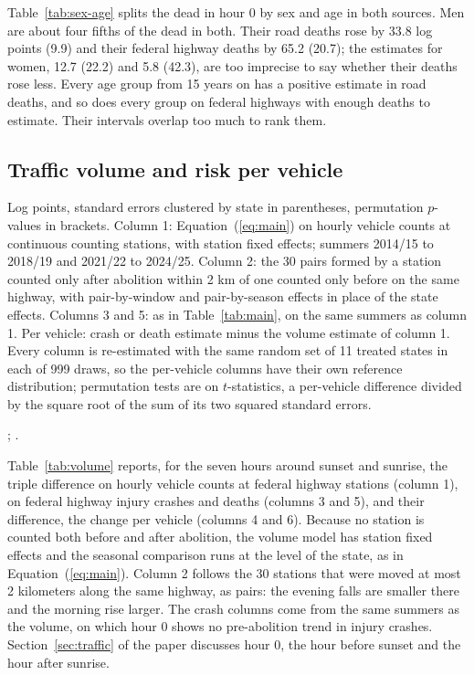 Table~\ref{tab:sex-age} splits the dead in hour 0 by sex and age in both sources. Men are about four fifths of the dead in both. Their road deaths rose by 33.8 log points (9.9) and their federal highway deaths by 65.2 (20.7); the estimates for women, 12.7 (22.2) and 5.8 (42.3), are too imprecise to say whether their deaths rose less. Every age group from 15 years on has a positive estimate in road deaths, and so does every group on federal highways with enough deaths to estimate. Their intervals overlap too much to rank them.

\subsection{Traffic volume and risk per vehicle}

\begin{table}[tbp]
  \caption{Traffic Volume and Risk per Vehicle on Federal Highways}
  \label{tab:volume}
  \centering\footnotesize
  
  \begin{tablenotes}[Notes]
  Log points, standard errors clustered by state in parentheses, permutation $p$-values in brackets. Column 1: Equation~(\ref{eq:main}) on hourly vehicle counts at continuous counting stations, with station fixed effects; summers 2014/15 to 2018/19 and 2021/22 to 2024/25. Column 2: the 30 pairs formed by a station counted only after abolition within 2 km of one counted only before on the same highway, with pair-by-window and pair-by-season effects in place of the state effects. Columns 3 and 5: as in Table~\ref{tab:main}, on the same summers as column 1. Per vehicle: crash or death estimate minus the volume estimate of column 1. Every column is re-estimated with the same random set of 11 treated states in each of 999 draws, so the per-vehicle columns have their own reference distribution; permutation tests are on $t$-statistics, a per-vehicle difference divided by the square root of the sum of its two squared standard errors.
  \end{tablenotes}
  \begin{tablenotes}[Sources]
  \citet{dnit2025pnct}; \citet{prf2025dados}.
  \end{tablenotes}
\end{table}

Table~\ref{tab:volume} reports, for the seven hours around sunset and sunrise, the triple difference on hourly vehicle counts at federal highway stations (column 1), on federal highway injury crashes and deaths (columns 3 and 5), and their difference, the change per vehicle (columns 4 and 6). Because no station is counted both before and after abolition, the volume model has station fixed effects and the seasonal comparison runs at the level of the state, as in Equation~(\ref{eq:main}). Column 2 follows the 30 stations that were moved at most 2 kilometers along the same highway, as pairs: the evening falls are smaller there and the morning rise larger. The crash columns come from the same summers as the volume, on which hour 0 shows no pre-abolition trend in injury crashes. Section~\ref{sec:traffic} of the paper discusses hour 0, the hour before sunset and the hour after sunrise.

